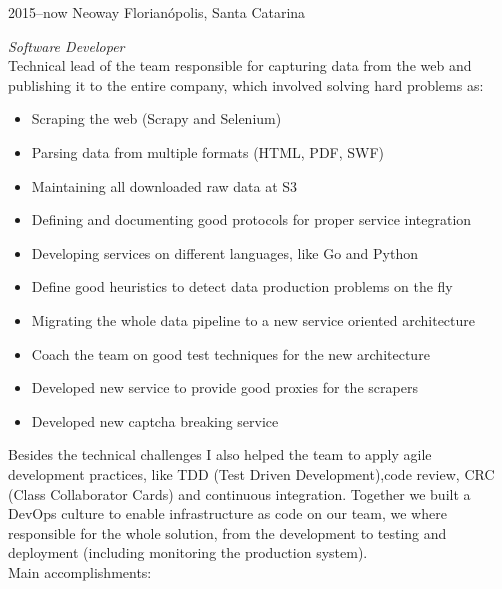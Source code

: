 \documentclass[]{friggeri-cv} %
\begin{document}
\begin{entrylist}
\entry
{2015--now}
{Neoway}
{Florianópolis, Santa Catarina}
{\emph{Software Developer} \\

    Technical lead of the team responsible for capturing data from the web and publishing it to the entire company,
which involved solving hard problems as:\\

\begin{itemize}
    \item Scraping the web (Scrapy and Selenium)
    \item Parsing data from multiple formats (HTML, PDF, SWF)
    \item Maintaining all downloaded raw data at S3
    \item Defining and documenting good protocols for proper service integration
    \item Developing services on different languages, like Go and Python
    \item Define good heuristics to detect data production problems on the fly
    \item Migrating the whole data pipeline to a new service oriented architecture
    \item Coach the team on good test techniques for the new architecture
    \item Developed new service to provide good proxies for the scrapers
    \item Developed new captcha breaking service
\end{itemize}

Besides the technical challenges I also helped the team to apply agile development practices, like
TDD (Test Driven Development),code review, CRC (Class Collaborator Cards) and continuous integration.
Together we built a DevOps culture to enable infrastructure as code on our team, we where responsible for the
whole solution, from the development to testing and deployment (including monitoring the production system).\\

Main accomplishments:

}
\end{entrylist}
\end{document}
